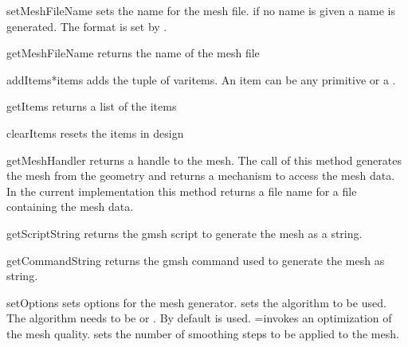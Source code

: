 \begin{methoddesc}[Design]{setMeshFileName}{}
sets the name for the mesh file. if no name is given a name is generated.
The format is set by .
\end{methoddesc}

\begin{methoddesc}[Design]{getMeshFileName}{}
returns the name of the mesh file
\end{methoddesc}


\begin{methoddesc}[Design]{addItems}{*items}
adds the tuple of var{items}. An item can be any primitive or a .
\end{methoddesc}

\begin{methoddesc}[Design]{getItems}{}
returns a list of the items
\end{methoddesc}

\begin{methoddesc}[Design]{clearItems}{}
resets the items in design
\end{methoddesc}

\begin{methoddesc}[Design]{getMeshHandler}{}
returns a handle to the mesh. The call of this method generates the mesh from the geometry and
returns a mechanism to access the mesh data. In the current implementation this
method returns a file name for a file containing the mesh data.
\end{methoddesc}

\begin{methoddesc}[Design]{getScriptString}{}
returns the gmsh script to generate the mesh as a string.
\end{methoddesc}

\begin{methoddesc}[Design]{getCommandString}{}
returns the gmsh command used to generate the mesh as string.
\end{methoddesc}

\begin{methoddesc}[Design]{setOptions}{}
sets options for the mesh generator.  sets the algorithm to be used.
The algorithm needs to be 
or . By default  is used. =\True invokes an optimization of the mesh quality.  sets the number of smoothing steps to be applied to the mesh.  
\end{methoddesc}


